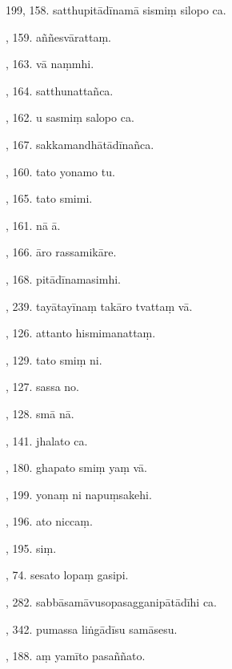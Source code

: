 199, 158. satthupitādīnamā sismiṃ silopo ca.\hfill \pageref{sut:199}\par {}, 159. aññesvārattaṃ.\hfill \pageref{sut:200}\par {}, 163. vā naṃmhi.\hfill \pageref{sut:201}\par {}, 164. satthunattañca.\hfill \pageref{sut:202}\par {}, 162. u sasmiṃ salopo ca.\hfill \pageref{sut:203}\par {}, 167. sakkamandhātādīnañca.\hfill \pageref{sut:204}\par {}, 160. tato yonamo tu.\hfill \pageref{sut:205}\par {}, 165. tato smimi.\hfill \pageref{sut:206}\par {}, 161. nā ā.\hfill \pageref{sut:207}\par {}, 166. āro rassamikāre.\hfill \pageref{sut:208}\par {}, 168. pitādīnamasimhi.\hfill \pageref{sut:209}\par {}, 239. tayātayīnaṃ takāro tvattaṃ vā.\hfill \pageref{sut:210}\par {}, 126. attanto hismimanattaṃ.\hfill \pageref{sut:211}\par {}, 129. tato smiṃ ni.\hfill \pageref{sut:212}\par {}, 127. sassa no.\hfill \pageref{sut:213}\par {}, 128. smā nā.\hfill \pageref{sut:214}\par {}, 141. jhalato ca.\hfill \pageref{sut:215}\par {}, 180. ghapato smiṃ yaṃ vā.\hfill \pageref{sut:216}\par {}, 199. yonaṃ ni napuṃsakehi.\hfill \pageref{sut:217}\par {}, 196. ato niccaṃ.\hfill \pageref{sut:218}\par {}, 195. siṃ.\hfill \pageref{sut:219}\par {}, 74. sesato lopaṃ gasipi.\hfill \pageref{sut:220}\par {}, 282. sabbāsamāvusopasagganipātādīhi ca.\hfill \pageref{sut:221}\par {}, 342. pumassa liṅgādīsu samāsesu.\hfill \pageref{sut:222}\par {}, 188. aṃ yamīto pasaññato.\hfill \pageref{sut:223}\par \noindent
